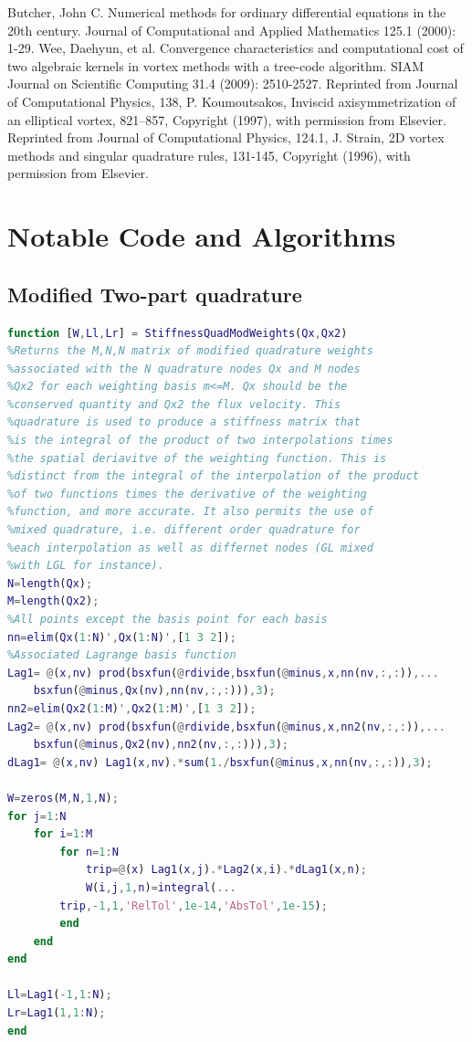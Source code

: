 \documentclass[letterpaper,12pt]{report}
\begin{document}
\begin{thebibliography}{8}
Butcher, John C. Numerical methods for ordinary differential equations in the 20th century. Journal of Computational and Applied Mathematics 125.1 (2000): 1-29.
Wee, Daehyun, et al. Convergence characteristics and computational cost of two algebraic kernels in vortex methods with a tree-code algorithm. SIAM Journal on Scientific Computing 31.4 (2009): 2510-2527.
Reprinted from  Journal of Computational Physics, 138, P. Koumoutsakos, Inviscid axisymmetrization of an elliptical vortex, 821–857, Copyright (1997), with permission from Elsevier.
Reprinted from Journal of Computational Physics, 124.1, J. Strain, 2D vortex methods and singular quadrature rules, 131-145, Copyright (1996), with permission from Elsevier.
\end{thebibliography}

\cleardoublepage
\appendix
{}
%
\chapter{Notable Code and Algorithms}\label{Algs}
\section{Modified Two-part quadrature}
\singlespacing
\begin{lstlisting}[language=Matlab]
function [W,Ll,Lr] = StiffnessQuadModWeights(Qx,Qx2)
%Returns the M,N,N matrix of modified quadrature weights
%associated with the N quadrature nodes Qx and M nodes
%Qx2 for each weighting basis m<=M. Qx should be the 
%conserved quantity and Qx2 the flux velocity. This 
%quadrature is used to produce a stiffness matrix that
%is the integral of the product of two interpolations times 
%the spatial deriavitve of the weighting function. This is 
%distinct from the integral of the interpolation of the product 
%of two functions times the derivative of the weighting 
%function, and more accurate. It also permits the use of
%mixed quadrature, i.e. different order quadrature for 
%each interpolation as well as differnet nodes (GL mixed 
%with LGL for instance).
N=length(Qx);
M=length(Qx2);
%All points except the basis point for each basis
nn=elim(Qx(1:N)',Qx(1:N)',[1 3 2]);
%Associated Lagrange basis function
Lag1= @(x,nv) prod(bsxfun(@rdivide,bsxfun(@minus,x,nn(nv,:,:)),...
	bsxfun(@minus,Qx(nv),nn(nv,:,:))),3);
nn2=elim(Qx2(1:M)',Qx2(1:M)',[1 3 2]);
Lag2= @(x,nv) prod(bsxfun(@rdivide,bsxfun(@minus,x,nn2(nv,:,:)),...
	bsxfun(@minus,Qx2(nv),nn2(nv,:,:))),3);
dLag1= @(x,nv) Lag1(x,nv).*sum(1./bsxfun(@minus,x,nn(nv,:,:)),3);

W=zeros(M,N,1,N);
for j=1:N
    for i=1:M
        for n=1:N
            trip=@(x) Lag1(x,j).*Lag2(x,i).*dLag1(x,n);
            W(i,j,1,n)=integral(...
		trip,-1,1,'RelTol',1e-14,'AbsTol',1e-15);
        end
    end
end

Ll=Lag1(-1,1:N);
Lr=Lag1(1,1:N);
end
\end{lstlisting}
\doublespacing
\end{document}
